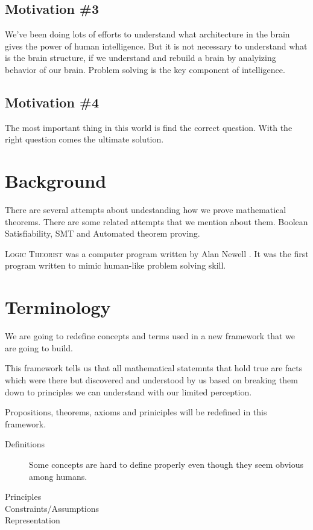 \documentclass{article}
\begin{document}
\subsection{Motivation \#3} 

We've been doing lots of efforts to understand what architecture in the brain gives the power of human intelligence. But it is not necessary to understand what is the brain structure, if we understand and rebuild a brain by analyizing behavior of our brain. Problem solving is the key component of intelligence. 


\subsection{Motivation \#4} 
The most important thing in this world is find the correct question. With the right question comes the ultimate solution.


\section{Background}

There are several attempts about undestanding how we prove mathematical theorems. There are some related attempts that we mention about them. Boolean Satisfiability, SMT and Automated theorem proving.

\textsc{Logic Theorist} was a computer program written by Alan Newell . It was the first program written to mimic human-like problem solving skill. 



\section{Terminology}

We are going to redefine concepts and terms used in a new framework that we are going to build.

This framework tells us that all mathematical statemnts that hold true are facts which were there but discovered and understood by us based on breaking them down to principles we can understand with our limited perception.

Propositions, theorems, axioms and priniciples will be redefined in this framework.

\begin{description}
\item[Definitions]
Some concepts are hard to define properly even though they seem obvious among humans. 
\item[Principles]
 
\item[Constraints/Assumptions]

\item[Representation]


\end{description} 
 
\end{document}
